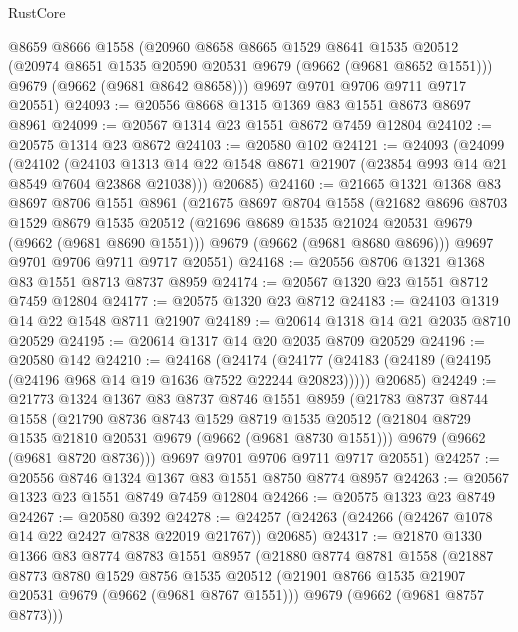 \begin{lexlean}{RustCore}
\begin{coremodule}
      @8659
      @8666
      @1558
      (@20960
        @8658
        @8665
        @1529
        @8641
        @1535
        @20512
        (@20974 @8651 @1535 @20590 @20531 @9679 (@9662 (@9681 @8652 @1551)))
        @9679
        (@9662 (@9681 @8642 @8658)))
      @9697
      @9701
      @9706
      @9711
      @9717
      @20551)
@24093 := @20556 @8668 @1315 @1369 @83 @1551 @8673 @8697 @8961
@24099 := @20567 @1314 @23 @1551 @8672 @7459 @12804
@24102 := @20575 @1314 @23 @8672
@24103 := @20580 @102
@24121 := @24093
    (@24099
      (@24102
        (@24103 @1313 @14 @22 @1548 @8671 @21907 (@23854 @993 @14 @21 @8549 @7604 @23868 @21038)))
      @20685)
@24160 := @21665
    @1321
    @1368
    @83
    @8697
    @8706
    @1551
    @8961
    (@21675
      @8697
      @8704
      @1558
      (@21682
        @8696
        @8703
        @1529
        @8679
        @1535
        @20512
        (@21696 @8689 @1535 @21024 @20531 @9679 (@9662 (@9681 @8690 @1551)))
        @9679
        (@9662 (@9681 @8680 @8696)))
      @9697
      @9701
      @9706
      @9711
      @9717
      @20551)
@24168 := @20556 @8706 @1321 @1368 @83 @1551 @8713 @8737 @8959
@24174 := @20567 @1320 @23 @1551 @8712 @7459 @12804
@24177 := @20575 @1320 @23 @8712
@24183 := @24103 @1319 @14 @22 @1548 @8711 @21907
@24189 := @20614 @1318 @14 @21 @2035 @8710 @20529
@24195 := @20614 @1317 @14 @20 @2035 @8709 @20529
@24196 := @20580 @142
@24210 := @24168
    (@24174
      (@24177 (@24183 (@24189 (@24195 (@24196 @968 @14 @19 @1636 @7522 @22244 @20823)))))
      @20685)
@24249 := @21773
    @1324
    @1367
    @83
    @8737
    @8746
    @1551
    @8959
    (@21783
      @8737
      @8744
      @1558
      (@21790
        @8736
        @8743
        @1529
        @8719
        @1535
        @20512
        (@21804 @8729 @1535 @21810 @20531 @9679 (@9662 (@9681 @8730 @1551)))
        @9679
        (@9662 (@9681 @8720 @8736)))
      @9697
      @9701
      @9706
      @9711
      @9717
      @20551)
@24257 := @20556 @8746 @1324 @1367 @83 @1551 @8750 @8774 @8957
@24263 := @20567 @1323 @23 @1551 @8749 @7459 @12804
@24266 := @20575 @1323 @23 @8749
@24267 := @20580 @392
@24278 := @24257 (@24263 (@24266 (@24267 @1078 @14 @22 @2427 @7838 @22019 @21767)) @20685)
@24317 := @21870
    @1330
    @1366
    @83
    @8774
    @8783
    @1551
    @8957
    (@21880
      @8774
      @8781
      @1558
      (@21887
        @8773
        @8780
        @1529
        @8756
        @1535
        @20512
        (@21901 @8766 @1535 @21907 @20531 @9679 (@9662 (@9681 @8767 @1551)))
        @9679
        (@9662 (@9681 @8757 @8773)))

\end{coremodule}
\end{lexlean}
